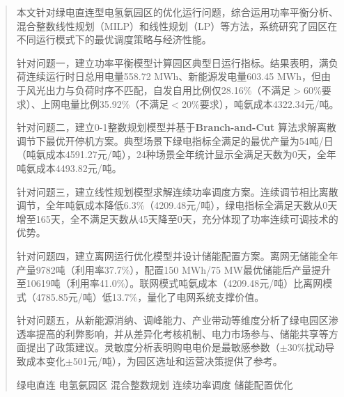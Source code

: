 \documentclass[a4paper]{neepumcm}
\begin{document}
\begin{abstract}

本文针对绿电直连型电氢氨园区的优化运行问题，综合运用功率平衡分析、混合整数线性规划（MILP）和线性规划（LP）等方法，系统研究了园区在不同运行模式下的最优调度策略与经济性能。

针对问题一，建立功率平衡模型计算园区典型日运行指标。结果表明，满负荷连续运行时日总用电量558.72 MWh、新能源发电量603.45 MWh，但由于风光出力与负荷时序不匹配，自发自用比例仅28.16\%（不满足$>$60\%要求）、上网电量比例35.92\%（不满足$<$20\%要求），吨氨成本4322.34元/吨。

针对问题二，建立0-1整数规划模型并基于\textbf{Branch-and-Cut} 算法求解离散调节下最优开停机方案。典型场景下绿电指标全满足的最优产量为54吨/日（吨氨成本4591.27元/吨），24种场景全年统计显示全满足天数为0天，全年吨氨成本4493.82元/吨。

针对问题三，建立线性规划模型求解连续功率调度方案。连续调节相比离散调节，全年吨氨成本降低6.3\%（4209.48元/吨），绿电指标全满足天数从0天增至165天，全不满足天数从45天降至0天，充分体现了功率连续可调技术的优势。

针对问题四，建立离网运行优化模型并设计储能配置方案。离网无储能全年产量9782吨（利用率37.7\%），配置150 MWh/75 MW最优储能后产量提升至10619吨（利用率41.0\%）。联网模式吨氨成本（4209.48元/吨）比离网模式（4785.85元/吨）低13.7\%，量化了电网系统支撑价值。

针对问题五，从新能源消纳、调峰能力、产业带动等维度分析了绿电园区渗透率提高的利弊影响，并从差异化考核机制、电力市场参与、储能共享等方面提出了政策建议。灵敏度分析表明购电电价是最敏感参数（$\pm$30\%扰动导致成本变化$\pm$501元/吨），为园区选址和运营决策提供了参考。

\begin{keywords}
绿电直连 \quad 电氢氨园区 \quad 混合整数规划 \quad 连续功率调度 \quad 储能配置优化
\end{keywords}
\end{abstract}

\maketitle
\newpage
\tableofcontents
\clearpage











\end{document}
